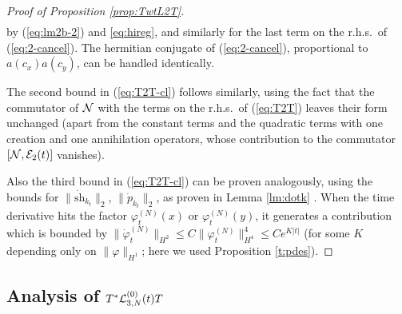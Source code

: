 \documentclass[11pt,a4paper]{article}
\newcommand{\cE}{{\cal E}}
\newcommand{\cL}{{\cal L}}
\newcommand{\cN}{{\cal N}}
\newcommand{\norm}[1]{\lVert#1\rVert}	%
\begin{document}
\begin{proof}[Proof of Proposition \ref{prop:TwtL2T}]
\[\begin{split}
\end{split} \]
by (\ref{eq:lm2b-2}) and \eqref{eq:hireg}, and similarly for the last term on the r.h.s.\ of (\ref{eq:2-cancel}).
The hermitian conjugate of (\ref{eq:2-cancel}), proportional to $a (c_x) a (c_y)$, can be handled identically. 

The second bound in (\ref{eq:T2T-cl}) follows similarly, using the fact that the commutator of $\cN$ with the terms on the r.h.s.\ of (\ref{eq:T2T}) leaves their form unchanged (apart from the constant terms and the quadratic terms with one creation and one annihilation operators, whose contribution to the commutator $[\cN , \cE_2 (t)]$ vanishes).  

Also the third bound in (\ref{eq:T2T-cl}) can be proven analogously, using
the bounds for $\| \dot{\text{sh}}_{k_t} \|_2$, $\| \dot{p}_{k_t} \|_2$, as proven in Lemma \ref{lm:dotk} . When the time derivative hits the factor $\varphi_t^{(N)} (x)$ or $\varphi_t^{(N)} (y)$, it generates a contribution which is bounded by $\| \dot\varphi_t^{(N)} \|_{H^2} \leq C \| \varphi_t^{(N)} \|_{H^4}^4 \leq C e^{K|t|}$ (for some $K$ depending only on $\norm{\varphi}_{H^1}$; here we used Proposition \ref{t:pdes}).
\end{proof}

\subsection{Analysis of $T^* \cL^{(0)}_{3,N} (t) T$}
\end{document}
